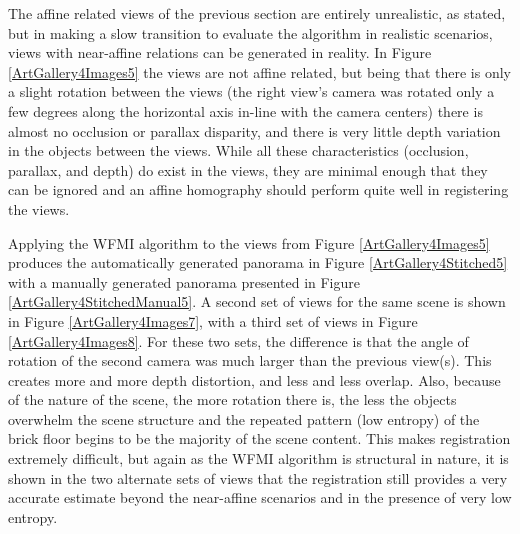 %
%
%
%
%
%
%
%
%

%
%
%



The affine related views of the previous section are entirely unrealistic, as stated, but in making a slow transition to evaluate the algorithm in realistic scenarios, views with near-affine relations can be generated in reality. In Figure \ref{ArtGallery4Images5} the views are not affine related, but being that there is only a slight rotation between the views (the right view's camera was rotated only a few degrees along the horizontal axis in-line with the camera centers) there is almost no occlusion or parallax disparity, and there is very little depth variation in the objects between the views. While all these characteristics (occlusion, parallax, and depth) do exist in the views, they are minimal enough that they can be ignored and an affine homography should perform quite well in registering the views.

Applying the WFMI algorithm to the views from Figure \ref{ArtGallery4Images5} produces the automatically generated panorama in Figure \ref{ArtGallery4Stitched5} with a manually generated panorama presented in Figure \ref{ArtGallery4StitchedManual5}. A second set of views for the same scene is shown in Figure \ref{ArtGallery4Images7}, with a third set of views in Figure \ref{ArtGallery4Images8}. For these two sets, the difference is that the angle of rotation of the second camera was much larger than the previous view(s). This creates more and more depth distortion, and less and less overlap. Also, because of the nature of the scene, the more rotation there is, the less the objects overwhelm the scene structure and the repeated pattern (low entropy) of the brick floor begins to be the majority of the scene content. This makes registration extremely difficult, but again as the WFMI algorithm is structural in nature, it is shown in the two alternate sets of views that the registration still provides a very accurate estimate beyond the near-affine scenarios and in the presence of very low entropy.

